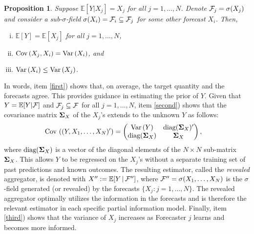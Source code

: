 \documentclass[11pt]{article}
\renewcommand{\P}{\mathbb{P}}
\newcommand{\E}{\mathbb{E}}
\newtheorem{proposition}[theorem]{Proposition}
\theoremstyle{definition}
\theoremstyle{definition}
\def\bSigma{{\bf \Sigma}}
\def\F{{\cal F}}
\def\P{{\mathbb P}}
\def\E{{\mathbb E}}
\def\Var{{\rm Var}\,}
\def\Cov{{\rm Cov}\,}
\def\|{\, | \,}
\def\diag{\text{diag}}
\def\diag{\text{diag}}
\begin{document}
\begin{proposition}
\label{covstr}
Suppose $\E[Y|X_j]  = X_j$ for all $j =1, \dots, N$. Denote $\F_j = \sigma(X_j)$ and consider a sub-$\sigma$-field $\sigma(X_i) = \F_i \subseteq \F_j$ for some other forecast $X_i$. Then,
\begin{enumerate}[i)] 
\item $\E[Y] = \E[X_j]$ for all $j = 1, \dots, N$, \label{first}
\item $\Cov(X_j, X_i) = \Var(X_i)$, and  \label{second}
\item $\Var(X_i) \leq \Var(X_j)$.  \label{third}
\end{enumerate}
\end{proposition}
In words, item \ref{first}) shows that, on average, the target quantity and the forecasts agree. This provides guidance in estimating the prior of $Y$. 
%
Given that $Y = \E[Y | \F]$ and $\F_j \subseteq \F$ for all $j = 1, \dots, N$, item \ref{second}) shows that the covariance matrix $\bSigma_X$ of the $X_j$'s extends to the unknown $Y$ as follows:
\begin{align}
\Cov\left((Y, X_1, \dots, X_N)'\right) &=  \left( \begin{matrix} 
 \Var(Y)  & \diag(\bSigma_X)'  \\
\diag(\bSigma_X) & \bSigma_X \\
\end{matrix} \right), \label{cov_str}
\end{align}
where $\diag(\bSigma_X)$ is a vector of the diagonal elements of the $N\times N$ sub-matrix $\bSigma_X$.
%
This allows $Y$ to be regressed on the $X_j$'s without a separate training set of past predictions and known outcomes. The resulting estimator, called the \textit{revealed} aggregator, is denoted with $X'' := \E [Y \|
\F'']$, where $\F'' = \sigma(X_1, \dots, X_N)$ is the $\sigma$-field generated (or revealed) by the forecasts
$\{X_j : j = 1, \dots, N \}$. The revealed aggregator optimally utilizes the information in the forecasts and is therefore the relevant estimator in each specific partial information model. Finally, item \ref{third}) shows that the variance of $X_j$ increases as Forecaster $j$  learns and becomes more informed. 
\end{document}
